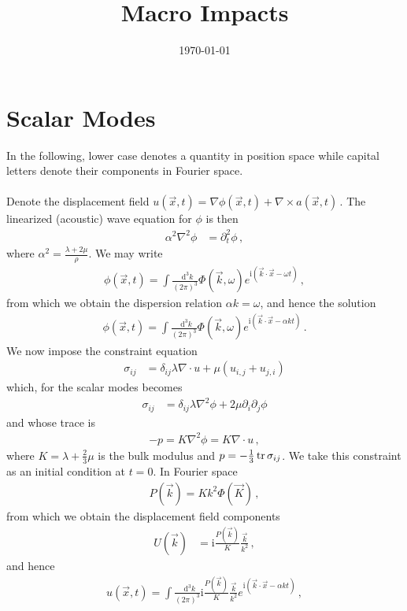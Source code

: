\documentclass{article}
\title{Macro Impacts}
\date{\today}
\newcommand*\diff{\mathop{}\!\mathrm{d}}
\newcommand*\te[1]{\text{#1}}
\newcommand*\f[2]{\frac{#1}{#2}}
\newcommand*\I{\te{i}}
\begin{document}
\maketitle
\section{Scalar Modes}
In the following, lower case denotes a quantity in position space while capital letters denote their components in Fourier space.
\\\\
Denote the displacement field $u(\vec x,t)=\nabla\phi(\vec x,t)+\nabla\times a(\vec x,t)$\,. The linearized (acoustic) wave equation for $\phi$ is then
\begin{align}
\alpha^2\nabla^2\phi&=\partial_t^2\phi\,,
\end{align}
where $\alpha^2=\f{\lambda+2\mu}{\rho}$. We may write
\begin{align}
\phi(\vec x,t)=\int\f{\diff^3 k}{(2\pi)^3}\Phi(\vec k,\omega)e^{\I(\vec k\cdot\vec x-\omega t)}\,,
\end{align}
from which we obtain the dispersion relation $\alpha k=\omega$, and hence the solution
\begin{align}
\phi(\vec x,t)=\int\f{\diff^3 k}{(2\pi)^3}\Phi(\vec k,\omega)e^{\I(\vec k\cdot\vec x-\alpha k t)}\,.
\end{align}
We now impose the constraint equation
\begin{align}
\sigma_{ij}&=\delta_{ij}\lambda\nabla\cdot u+\mu(u_{i,j}+u_{j,i})
\end{align}
which, for the scalar modes becomes
\begin{align}
\sigma_{ij}&=\delta_{ij}\lambda\nabla^2\phi+2\mu\partial_i\partial_j\phi
\end{align}
and whose trace is
\begin{align}
-p=K\nabla^2\phi=K\nabla\cdot u\,,
\end{align}
where $K=\lambda+\f23\mu$ is the bulk modulus and $p=-\f13\tr\sigma_{ij}$. We take this constraint as an initial condition at $t=0$. In Fourier space
\begin{align}
P(\vec k)=Kk^2\Phi(\vec K)\,,
\end{align}
from which we obtain the displacement field components
\begin{align}
U(\vec k)&=\I\f{P(\vec k)}{K}\f{\vec k}{k^2}\,,
\end{align}
and hence
\begin{align}
u(\vec x,t)=\int\f{\diff^3 k}{(2\pi)^3}\I\f{P(\vec k)}{K}\f{\vec k}{k^2}e^{\I(\vec k\cdot\vec x-\alpha k t)}\,,
\end{align}
\end{document}
